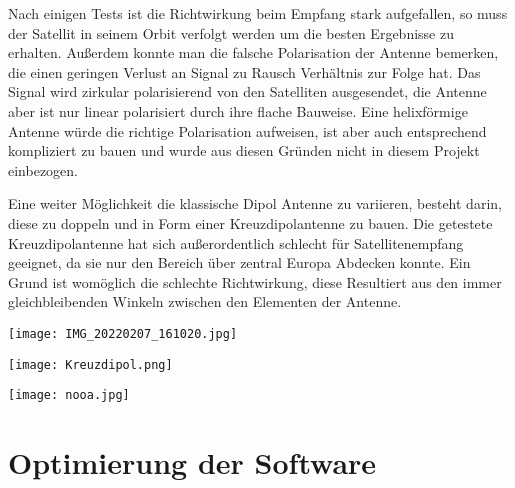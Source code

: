 \newpage
\begin{multicols*}{2}

    Nach einigen Tests ist die Richtwirkung beim Empfang stark aufgefallen, so muss der Satellit in seinem Orbit verfolgt werden um die besten Ergebnisse zu erhalten. Außerdem konnte man die falsche Polarisation der Antenne bemerken, die einen geringen Verlust an Signal zu Rausch Verhältnis zur Folge hat. Das Signal wird zirkular polarisierend von den Satelliten ausgesendet, die Antenne aber ist nur linear polarisiert durch ihre flache Bauweise. Eine helixförmige Antenne würde die richtige Polarisation aufweisen, ist aber auch entsprechend kompliziert zu bauen und wurde aus diesen Gründen nicht in diesem Projekt einbezogen. 

    Eine weiter Möglichkeit die klassische Dipol Antenne zu variieren, besteht darin, diese zu doppeln und in Form einer Kreuzdipolantenne zu bauen. Die getestete Kreuzdipolantenne hat sich außerordentlich schlecht für Satellitenempfang geeignet, da sie nur den Bereich über zentral Europa Abdecken konnte. Ein Grund ist womöglich die schlechte Richtwirkung, diese Resultiert aus den immer gleichbleibenden Winkeln zwischen den Elementen der Antenne. 
    \columnbreak
    \begin{center}
        \centering
        \texttt{[image: IMG\_20220207\_161020.jpg]}
    \end{center}
    
\end{multicols*}



\begin{center}
    \centering
    \texttt{[image: Kreuzdipol.png]}
\end{center}

\begin{center}
    \centering
    \texttt{[image: nooa.jpg]}
\end{center}



\section[]{Optimierung der Software}
